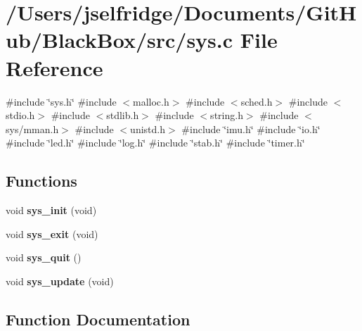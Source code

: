 \section{/\+Users/jselfridge/\+Documents/\+Git\+Hub/\+Black\+Box/src/sys.c File Reference}
\label{sys_8c}
{\ttfamily \#include \char`\"{}sys.\+h\char`\"{}}\newline
{\ttfamily \#include $<$malloc.\+h$>$}\newline
{\ttfamily \#include $<$sched.\+h$>$}\newline
{\ttfamily \#include $<$stdio.\+h$>$}\newline
{\ttfamily \#include $<$stdlib.\+h$>$}\newline
{\ttfamily \#include $<$string.\+h$>$}\newline
{\ttfamily \#include $<$sys/mman.\+h$>$}\newline
{\ttfamily \#include $<$unistd.\+h$>$}\newline
{\ttfamily \#include \char`\"{}imu.\+h\char`\"{}}\newline
{\ttfamily \#include \char`\"{}io.\+h\char`\"{}}\newline
{\ttfamily \#include \char`\"{}led.\+h\char`\"{}}\newline
{\ttfamily \#include \char`\"{}log.\+h\char`\"{}}\newline
{\ttfamily \#include \char`\"{}stab.\+h\char`\"{}}\newline
{\ttfamily \#include \char`\"{}timer.\+h\char`\"{}}\newline
\subsection*{Functions}
\begin{DoxyCompactItemize}
\item 
void \textbf{ sys\+\_\+init} (void)
\item 
void \textbf{ sys\+\_\+exit} (void)
\item 
void \textbf{ sys\+\_\+quit} ()
\item 
void \textbf{ sys\+\_\+update} (void)
\end{DoxyCompactItemize}


\subsection{Function Documentation}
\mbox{\label{sys_8c_ac8c2364fd51221e5ac983f174aeb289f}} 
